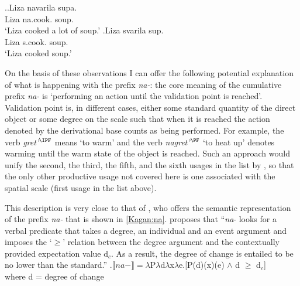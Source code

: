 \ex.\ag.\label{ex:navarit}Liza navarila supa.\\
Liza na.cook. soup.\\
\trans `Liza cooked a lot of soup.'
\bg.\label{ex:svarit}Liza svarila sup.\\
Liza s.cook. soup.\\
\trans `Liza cooked soup.'

On the basis of these observations I can offer the following potential explanation of what is happening with the prefix \textit{na-}: the core meaning of the cumulative prefix \textit{na-} is `performing an action until the validation point is reached'. Validation point is, in different cases, either some standard quantity of the direct object or some degree on the scale such that when it is reached the action denoted by the derivational base counts as being performed. For example, the verb \textit{gret'}$^{\IPF}$ means `to warm' and the verb \textit{nagret'}$^{\PF}$ `to heat up' denotes warming until the warm state of the object is reached. Such an approach would unify the second, the third, the fifth, and the sixth usages in the list by \citet{Shvedova:82}, so that the only other productive usage not covered here is one associated with the spatial scale (first usage in the list above). 

This description is very close to that of \citet{Kagan:book}, who offers the semantic representation of the prefix \textit{na-} that is shown in \ref{Kagan:na}. \citet[55]{Kagan:book} proposes that ``\textit{na}- looks for a verbal predicate that takes a degree, an individual and an event argument and imposes the `$\geqslant$' relation between the degree argument and the contextually provided expectation value d$_c$. As a result, the degree of change is entailed to be no lower than the standard.''
\ex.\label{Kagan:na}$\llbracket na- \rrbracket = \lambda$P$\lambda$d$\lambda$x$\lambda$e.[P(d)(x)(e) $\wedge$ d $\geqslant$ d$_c$]\\
where d = degree of change \citep{KennedyLevin:02}\\

